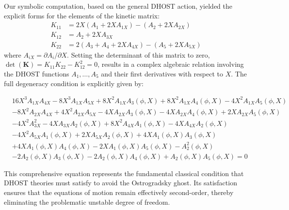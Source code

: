 \documentclass[twocolumn]{aastex631}
\begin{document}
Our symbolic computation, based on the general DHOST action, yielded the explicit forms for the elements of the kinetic matrix:
\begin{align*}
K_{11} &= 2 X (A_1 + 2 X A_{1X}) - (A_2 + 2 X A_{2X}) \\
K_{12} &= A_2 + 2 X A_{3X} \\
K_{22} &= 2 (A_3 + A_4 + 2 X A_{4X}) - (A_5 + 2 X A_{5X})
\end{align*}
where $A_{iX} = \partial A_i / \partial X$. Setting the determinant of this matrix to zero, $\det(\mathbf{K}) = K_{11}K_{22} - K_{12}^2 = 0$, results in a complex algebraic relation involving the DHOST functions $A_1, \dots, A_5$ and their first derivatives with respect to $X$. The full degeneracy condition is explicitly given by:
\begin{widetext} %
\begin{equation}
\begin{split}
& 16 X^3 A_{1X} A_{4X} - 8 X^3 A_{1X} A_{5X} + 8 X^2 A_{1X} A_3(\phi, X) + 8 X^2 A_{1X} A_4(\phi, X) - 4 X^2 A_{1X} A_5(\phi, X) \\
& - 8 X^2 A_{2X} A_{4X} + 4 X^2 A_{2X} A_{5X} - 4 X A_{2X} A_3(\phi, X) - 4 X A_{2X} A_4(\phi, X) + 2 X A_{2X} A_5(\phi, X) \\
& - 4 X^2 A_{3X}^2 - 4 X A_{3X} A_2(\phi, X) + 8 X^2 A_{4X} A_1(\phi, X) - 4 X A_{4X} A_2(\phi, X) \\
& - 4 X^2 A_{5X} A_1(\phi, X) + 2 X A_{5X} A_2(\phi, X) + 4 X A_1(\phi, X) A_3(\phi, X) \\
& + 4 X A_1(\phi, X) A_4(\phi, X) - 2 X A_1(\phi, X) A_5(\phi, X) - A_2^2(\phi, X) \\
& - 2 A_2(\phi, X) A_3(\phi, X) - 2 A_2(\phi, X) A_4(\phi, X) + A_2(\phi, X) A_5(\phi, X) = 0
\end{split}
\label{eq:full_degeneracy_condition}
\end{equation}
\end{widetext}
This comprehensive equation represents the fundamental classical condition that DHOST theories must satisfy to avoid the Ostrogradsky ghost. Its satisfaction ensures that the equations of motion remain effectively second-order, thereby eliminating the problematic unstable degree of freedom.
\end{document}
